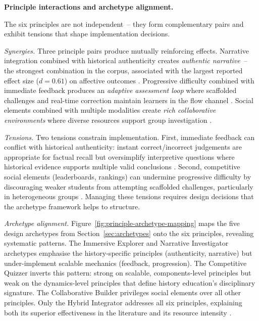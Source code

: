 \textbf{Principle interactions and archetype alignment.} \label{sec:principle-interactions}

The six principles are not independent~-- they form complementary pairs and exhibit tensions that shape implementation decisions.

\textit{Synergies.} Three principle pairs produce mutually reinforcing effects. Narrative integration combined with historical authenticity creates \textit{authentic narrative}~-- the strongest combination in the corpus, associated with the largest reported effect size ($d = 0.61$) on affective outcomes \cite{SailerHomner2020, 15Slater2022}. Progressive difficulty combined with immediate feedback produces an \textit{adaptive assessment loop} where scaffolded challenges and real-time correction maintain learners in the flow channel \cite{Csikszentmihalyi1990}. Social elements combined with multiple modalities create \textit{rich collaborative environments} where diverse resources support group investigation \cite{49Huizenga2007127, 46Stirling2022}.

\textit{Tensions.} Two tensions constrain implementation. First, immediate feedback can conflict with historical authenticity: instant correct/incorrect judgements are appropriate for factual recall but oversimplify interpretive questions where historical evidence supports multiple valid conclusions \cite{Clark2016, Wineburg2001}. Second, competitive social elements (leaderboards, rankings) can undermine progressive difficulty by discouraging weaker students from attempting scaffolded challenges, particularly in heterogeneous groups \cite{11Ternblad2023115, vanRoyZaman2019}. Managing these tensions requires design decisions that the archetype framework helps to structure.

\textit{Archetype alignment.} Figure~\ref{fig:principle-archetype-mapping} maps the five design archetypes from Section~\ref{sec:archetypes} onto the six principles, revealing systematic patterns. The Immersive Explorer and Narrative Investigator archetypes emphasise the history-specific principles (authenticity, narrative) but under-implement scalable mechanics (feedback, progression). The Competitive Quizzer inverts this pattern: strong on scalable, components-level principles but weak on the dynamics-level principles that define history education's disciplinary signature. The Collaborative Builder privileges social elements over all other principles. Only the Hybrid Integrator addresses all six principles, explaining both its superior effectiveness in the literature and its resource intensity \cite{KorniienkoSemerikov2024, Korniienko2025aredu, Sailer2017}.

